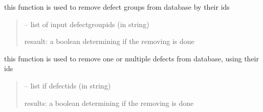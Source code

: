 \documentclass[letterpaper,10pt,english]{sphinxmanual}
\begin{document}
\begin{savenotes}
\begin{fulllineitems}
\begin{savenotes}\begin{fulllineitems}
\label{\detokenize{setting/database_utils:oxin.database_utils.dataBaseUtils.remove_defect_groups}}
\pysigstartsignatures
{}
\pysigstopsignatures
\sphinxAtStartPar
this function is used to remove defect groups from database by their ids
\begin{quote}\begin{description}
\sphinxAtStartPar
{} – list of input defect\sphinxhyphen{}group\sphinxhyphen{}ids (in string)

\sphinxAtStartPar
resault: a boolean determining if the removing is done

\end{description}\end{quote}

\end{fulllineitems}\end{savenotes}


\begin{savenotes}\begin{fulllineitems}
\label{\detokenize{setting/database_utils:oxin.database_utils.dataBaseUtils.remove_defects}}
\pysigstartsignatures
{}
\pysigstopsignatures
\sphinxAtStartPar
this function is used to remove one or multiple defects from database, using their ids
\begin{quote}\begin{description}
\sphinxAtStartPar
{} – list if defect\sphinxhyphen{}ids (in string)

\sphinxAtStartPar
results: a boolean determining if the removing is done

\end{description}\end{quote}

\end{fulllineitems}\end{savenotes}


\end{fulllineitems}
\end{savenotes}
\end{document}
